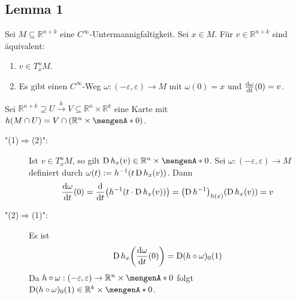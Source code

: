 \subsection[Lemma 1: Vektoren in $T^u_x M$ sind Geschwindigkeitsvektoren von Wegen durch $x$]{Lemma 1} %
\label{sub:184}
Sei $M \subseteq \mathds{R}^{n+k}$ eine $C^\infty$-Untermannigfaltigkeit. Sei $x \in M$. Für $v \in \mathds{R}^{n+k}$ sind äquivalent:
\begin{enumerate}[(1)]
	\item $v \in T^u_x M$.
	\item Es gibt einen $C^\infty$-Weg $\omega : (-\varepsilon, \varepsilon) \to M$ mit $\omega(0)=x$ und $\frac{\mathrm{d} \omega}{\mathrm{d} t} (0)=v$.
\end{enumerate}
Sei $\mathds{R}^{n+k} \supseteq U \xrightarrow{h} V \subseteq \mathds{R}^n \times \mathds{R}^k $ eine Karte mit $h(M \cap U) = V \cap (\mathds{R}^n \times \set{0})$.
\begin{description}
	\item["(1)$\Rightarrow$(2)":] Ist $v \in T_x^u M$, so gilt $\D h_x (v) \in \mathds{R}^n \times \set{0}$. Sei $\omega : (-\varepsilon,\varepsilon) \to M$ definiert durch
	$\omega(t) := h ^{-1} \enbrace*{t \D h_x(v)}$. Dann 
	\begin{align*}
		\diffd{\omega}{t}(0) = \diffd{}{t} \enbrace*{h ^{-1} \enbrace*{t \cdot \D h_x(v)} } = \enbrace*{\D h ^{-1}}_{h(x)} \enbrace*{\D h_x (v)} = v   
	\end{align*}
	\item["(2)$\Rightarrow$(1)":] Es ist 
	\begin{align*}
		\D h_x \enbrace*{\diffd{\omega}{t}(0)} = \D(h \circ \omega)_0 (1) 
	\end{align*}
	Da $h \circ \omega : (-\varepsilon,\varepsilon) \to \mathds{R}^n \times \set{0}$ folgt $\D(h \circ \omega)_0 (1) \in \mathds{R}^k \times \set{0}$. \bewende
\end{description}

